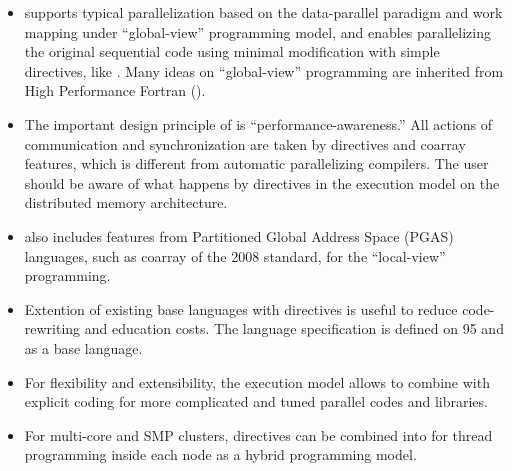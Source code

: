 \begin{itemize}

 \item {\XMP} supports typical parallelization based on the
       data-parallel paradigm and work mapping under ``global-view''
       programming model, and enables parallelizing the original
       sequential code using minimal modification with simple
       directives, like {\OMP}. Many ideas on ``global-view''
       programming are inherited from High Performance Fortran ({\HPF}).

 \item The important design principle of {\XMP} is
       ``performance-awareness.'' All actions of communication and
       synchronization are taken by directives and coarray features,
       which is different from automatic parallelizing compilers. The
       user should be aware of what happens by {\XMP} directives in the
       execution model on the distributed memory architecture.

 \item {\XMP} also includes features from Partitioned Global Address
       Space (PGAS) languages, such as coarray of the {\Fort} 2008
       standard, for the ``local-view'' programming.

 \item Extention of existing base languages with directives is useful to
       reduce code-rewriting and education costs. The {\XMP} language
       specification is defined on {\Fort} 95 and {\C} as a base
       language.

 \item For flexibility and extensibility, the execution model allows to
       combine with explicit {\MPI} coding for more complicated and
       tuned parallel codes and libraries.

 \item For multi-core and SMP clusters, {\OMP} directives can be
       combined into {\XMP} for thread programming inside each node as a
       hybrid programming model.


\end{itemize}
